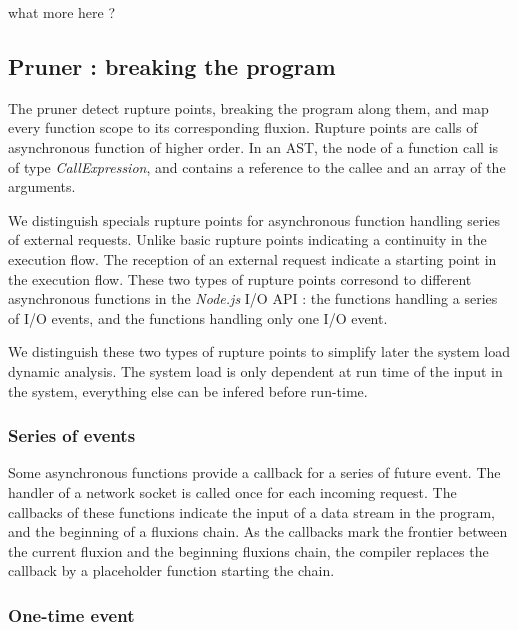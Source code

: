 \TODO what more here ?


\subsection{Pruner : breaking the program}

The pruner detect rupture points, breaking the program along them, and map every function scope to its corresponding fluxion.
Rupture points are calls of asynchronous function of higher order.
In an AST, the node of a function call is of type \textit{CallExpression}, and contains a reference to the callee and an array of the arguments.




We distinguish specials rupture points for asynchronous function handling series of external requests.
Unlike basic rupture points indicating a continuity in the execution flow.
The reception of an external request indicate a starting point in the execution flow.
These two types of rupture points corresond to different asynchronous functions in the \textit{Node.js} I/O API : the functions handling a series of I/O events, and the functions handling only one I/O event.

We distinguish these two types of rupture points to simplify later the system load dynamic analysis.
The system load is only dependent at run time of the input in the system, everything else can be infered before run-time.

\subsubsection{Series of events} \label{sss:start}

Some asynchronous functions provide a callback for a series of future event.
The handler of a network socket is called once for each incoming request.
The callbacks of these functions indicate the input of a data stream in the program, and the beginning of a fluxions chain.
As the callbacks mark the frontier between the current fluxion and the beginning fluxions chain, the compiler replaces the callback by a placeholder function starting the chain.

\subsubsection{One-time event} \label{sss:post}

